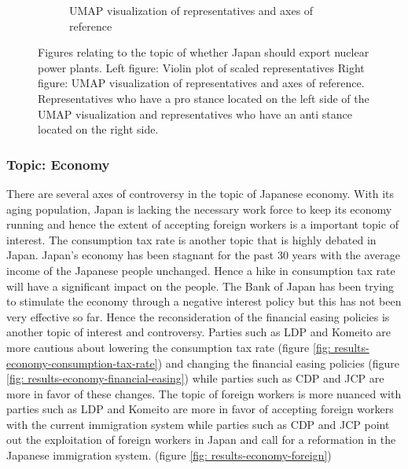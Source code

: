 \documentclass[final,5p,times,twocolumn,authoryear]{elsarticle}
\begin{document}
\begin{figure}[h]
\begin{subfigure}{0.22\textwidth}
      \caption{UMAP visualization of representatives and axes of reference}
    \end{subfigure}
\caption{Figures relating to the topic of whether Japan should export nuclear power plants. Left figure: Violin plot of scaled representatives Right figure: UMAP visualization of representatives and axes of reference. Representatives who have a pro stance located on the left side of the UMAP visualization and representatives who have an anti stance located on the right side.}
\label{fig: results-nuclear-export}
\end{figure}

\FloatBarrier

\subsubsection{Topic: Economy}

There are several axes of controversy in the topic of Japanese economy. With its aging population, Japan is lacking the necessary work force to keep its economy running and hence the extent of accepting foreign workers is a important topic of interest. The consumption tax rate is another topic that is highly debated in Japan. Japan's economy has been stagnant for the past 30 years with the average income of the Japanese people unchanged. Hence a hike in consumption tax rate will have a significant impact on the people. The Bank of Japan has been trying to stimulate the economy through a negative interest policy but this has not been very effective so far. Hence the reconsideration of the financial easing policies is another topic of interest and controversy. Parties such as LDP and Komeito are more cautious about lowering the consumption tax rate (figure \ref{fig: results-economy-consumption-tax-rate}) and changing the financial easing policies (figure \ref{fig: results-economy-financial-easing}) while parties such as CDP and JCP are more in favor of these changes. The topic of foreign workers is more nuanced with parties such as LDP and Komeito are more in favor of accepting foreign workers with the current immigration system while parties such as CDP and JCP point out the exploitation of foreign workers in Japan and call for a reformation in the Japanese immigration system. (figure \ref{fig: results-economy-foreign})
\end{document}
